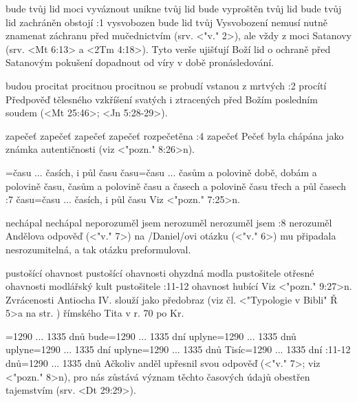     {bude tvůj lid moci vyváznout} %
    {unikne tvůj lid}  %
    {bude vyproštěn tvůj lid} %
    {bude tvůj lid zachráněn}  %
    {obstojí}  %
:1 {vysvobozen bude lid tvůj} Vysvobození nemusí nutně znamenat záchranu před  mučednictvím (srv. <"v." 2>), ale vždy z moci Satanovy (srv. <Mt 6:13> a <2Tm 4:18>). Tyto verše ujišťují Boží lid o ochraně před Satanovým pokušení dopadnout od víry v době pronásledování. 

    {budou procitat} %
    {procitnou}  %
    {procitnou} %
    {se probudí}  %
    {vstanou z mrtvých}  %
:2 {procítí} Předpověď tělesného vzkříšení svatých i ztracených před Božím posledním soudem (<Mt 25:46>; <Jn 5:28-29>).

    {zapečeť} %
    {zapečeť}  %
    {zapečeť} %
    {zapečeť}  %
    {rozpečetěna}  %
:4 {zapečeť} Pečeť byla chápána jako známka autentičnosti (viz <"pozn." 8:26>n).

={času ... časích, i půl času}  %
    {času}={času ... časům a polovině} %
    {době, dobám a polovině}  %
    {času, časům a polovině} %
    {času a časech a polovině času}  %
    {třech a půl časech}  %
:7 {času}={času ... časích, i půl času} Viz <"pozn." 7:25>n.


    {nechápal} %
    {nechápal}  %
    {neporozuměl jsem} %
    {nerozuměl}  %
    {nerozuměl jsem}  %
:8 {nerozuměl} Andělova odpověď (<"v." 7>) na \x/Daniel/ovi otázku (<"v." 6>) mu připadala nesrozumitelná, a tak otázku preformuloval. 


    {pustošící ohavnost} %
    {pustošící ohavnosti}  %
    {ohyzdná modla pustošitele} %
    {otřesné ohavnosti}  %
    {modlářský kult pustošitele}  %
:11-12 {ohavnost hubící} Viz <"pozn." 9:27>n. Zvrácenosti Antiocha IV. slouží jako předobraz (viz čl. <"Typologie v Bibli" Ř 5>a na str. \pg) římského Tita v r. 70 po Kr. 
 
={1290 ... 1335 dnů}      %
    {bude}={1290 ... 1335 dní}      %
    {uplyne}={1290 ... 1335 dnů}    %
    {uplyne}={1290 ... 1335 dní}    %
    {uplyne}={1290 ... 1335 dnů}    %
    {Tisíc}={1290 ... 1335 dní}     %
:11-12 {dnů}={1290 ... 1335 dnů} Ačkoliv anděl upřesnil svou odpověď (<"v." 7>; viz <"pozn." 8>n), pro nás zůstává význam těchto časových údajů obestřen tajemstvím (srv. <Dt 29:29>).






\endinput

\ww {}  %
    {} %
    {}  %
    {} %
    {}  %
    {}  %
    
\Note 12:1 {}={}  \x// (<"">) (<"">) 

 >> Ptolemaios II Filadelfos incest s Arsinou II
 >> Ptolemaios III Euergetes rozvedl z Láodikou, oženil s Berenikou
 >> Ptolemaios IV? Filopator
 >> Ptolemaios V == Kleopatra III
 >> Ptolemaios VI
 >> Kleopatry III  
 >> Ptolemaios IX Soter  (Ptolemaios X jeho brácha) syn Kleopatry III + Ptolemaia VIII  
 >> Ptolemaios XII 
 >> Kleopatra VII
 
